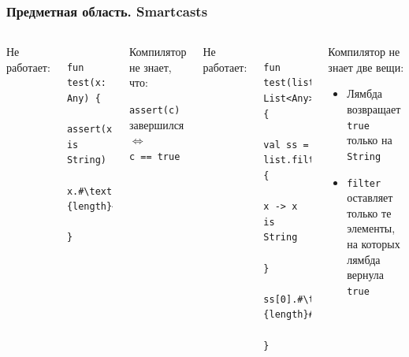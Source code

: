 \documentclass{beamer}
\newcommand{\code}[1]{\texttt{#1}}
\begin{document}
\begin{frame}[fragile]\frametitle{Предметная область. Smartcasts}
\begin{columns}[T]
    
    Не работает:
    
    \begin{verbatim}
        fun test(x: Any) {
            assert(x is String)
            x.#\textcolor{red}{length}#
        }
    \end{verbatim}
    
    \begin{small}
        Компилятор не знает, что:
        
        \code{assert(c)} завершился \\ $\Leftrightarrow$ \\ \code{c == true}
                
    \end{small}
        
    
    Не работает:
    
    \begin{verbatim}
        fun test(list: List<Any>) {
          val ss = list.filter {
              x -> x is String
          }
          ss[0].#\textcolor{red}{length}#
        }
    \end{verbatim}
    
    \begin{small}
        Компилятор не знает две вещи:
        \begin{itemize}
            \item Лямбда возвращает \code{true} только на \code{String}
            
            \item \code{filter} оставляет только те элементы, на которых лямбда вернула \code{true}
            
        \end{itemize}
    \end{small}
\end{columns}
\end{frame}
\end{document}
